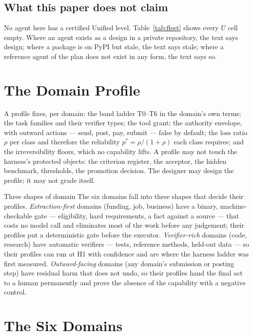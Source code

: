 \subsection{What this paper does not claim}

No agent here has a certified Unified level. Table~\ref{tab:fleet} shows every $U$ cell empty. Where an agent exists as a design in a private repository, the text says design; where a package is on PyPI but stale, the text says stale; where a reference agent of the plan does not exist in any form, the text says so.

\section{The Domain Profile}\label{sec:profile}

A profile fixes, per domain: the band ladder T0--T6 in the domain's own terms; the task families and their verifier types; the tool grant; the authority envelope, with outward actions --- send, post, pay, submit --- false by default; the loss ratio $\rho$ per class and therefore the reliability $p^{*} = \rho/(1+\rho)$ each class requires; and the irreversibility floors, which no capability lifts. A profile may not touch the harness's protected objects: the criterion register, the acceptor, the hidden benchmark, thresholds, the promotion decision. The designer may design the profile; it may not grade itself.

\begin{claimbox}{Three shapes of domain}
The six domains fall into three shapes that decide their profiles. \emph{Extraction-first} domains (funding, job, business) have a binary, machine-checkable gate --- eligibility, hard requirements, a fact against a source --- that costs no model call and eliminates most of the work before any judgement; their profiles put a deterministic gate before the executor. \emph{Verifier-rich} domains (code, research) have automatic verifiers --- tests, reference methods, held-out data --- so their profiles can run at H1 with confidence and are where the harness ladder was first measured. \emph{Outward-facing} domains (any domain's submission or posting step) have residual harm that does not undo, so their profiles hand the final act to a human permanently and prove the absence of the capability with a negative control.
\end{claimbox}

\section{The Six Domains}\label{sec:domains}

